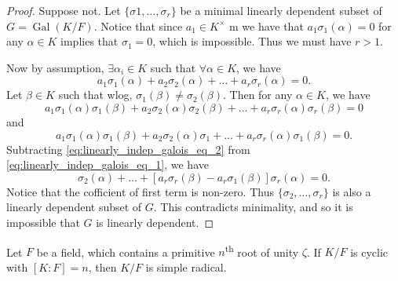 \documentclass[notoc,notitlepage,nobib]{tufte-book}
\DeclareMathOperator{\Gal}{Gal}
\begin{document}
\begin{proof}
  Suppose not. Let $\{ \sigma1, \ldots, \sigma_r \}$ be a minimal linearly
  dependent subset of $G = \Gal(K / F)$. Notice that since $a_1 \in K^\times$ m
  we have that $a_1 \sigma_1(\alpha) = 0$ for any $\alpha \in K$ implies that
  $\sigma_1 = 0$, which is impossible. Thus we must have $r > 1$.

  Now by assumption, $\exists \alpha_i \in K$ such that $\forall \alpha \in K$,
  we have
  \begin{equation*}
    a_1 \sigma_1(\alpha) + a_2 \sigma_2(\alpha) + \hdots + a_r \sigma_r(\alpha)
    = 0.
  \end{equation*}
  Let $\beta \in K$ such that wlog, $\sigma_1(\beta) \neq \sigma_2(\beta)$. Then
  for any $\alpha \in K$, we have
  \begin{equation}\label{eq:linearly_indep_galois_eq_1}
    a_1\sigma_1(\alpha)\sigma_1(\beta) + a_2\sigma_2(\alpha)\sigma_2(\beta) +
    \hdots + a_r\sigma_r(\alpha)\sigma_r(\beta) = 0
  \end{equation}
  and
  \begin{equation}\label{eq:linearly_indep_galois_eq_2}
    a_1\sigma_1(\alpha)\sigma_1(\beta) + a_2\sigma_2(\alpha)\sigma_1 + \hdots +
    a_r\sigma_r(\alpha)\sigma_1(\beta) = 0.
  \end{equation}
  Subtracting \cref{eq:linearly_indep_galois_eq_2} from
  \cref{eq:linearly_indep_galois_eq_1}, we have
  \begin{equation*}
    [a_2\sigma_2(\beta) - a_2\sigma_1(\beta)]\sigma_2(\alpha) + \hdots +
    [a_r\sigma_r(\beta) - a_r\sigma_1(\beta)]\sigma_r(\alpha) = 0.
  \end{equation*}
  Notice that the cofficient of first term is non-zero. Thus $\{ \sigma_2,
  \ldots, \sigma_r \}$ is also a linearly dependent subset of $G$. This
  contradicts minimality, and so it is impossible that $G$ is linearly
  dependent.
\end{proof}

\begin{propo}\label{propo:cyclic_extensions_over_base_with_primitive_roots_are_simple_radical}
  Let $F$ be a field, which contains a primitive $n$\textsuperscript{th} root of
  unity $\zeta$. If $K / F$ is cyclic with $[K : F] = n$, then $K / F$ is simple
  radical.
\end{propo}
\end{document}
